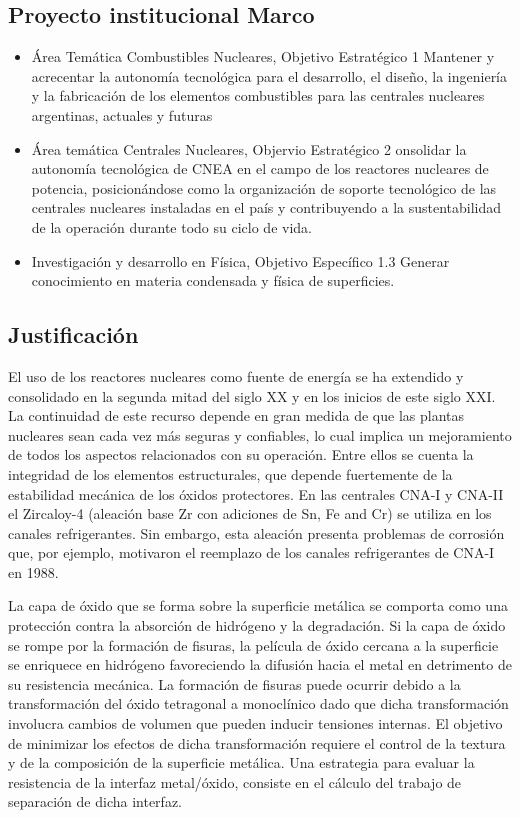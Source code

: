 \subsection{Proyecto institucional Marco}
\begin{itemize}
  \item { Área Temática Combustibles Nucleares, Objetivo Estratégico 1 }
    Mantener y acrecentar la autonomía tecnológica para el desarrollo, el diseño, la ingeniería y la fabricación de los elementos combustibles para las centrales nucleares argentinas, actuales y futuras

  \item {Área temática Centrales Nucleares, Objervio Estratégico 2}
onsolidar la autonomía tecnológica de CNEA en el campo de los reactores nucleares de potencia, posicionándose como la organización de soporte tecnológico de las centrales nucleares instaladas en el país y contribuyendo a la sustentabilidad de la operación durante todo su ciclo de vida. 

\item {Investigación y desarrollo en Física, Objetivo Específico 1.3}
Generar conocimiento en materia condensada y física de superficies.

\end{itemize}


\subsection{Justificación}

El uso de los reactores nucleares como fuente de energía se ha extendido y 
consolidado en la segunda mitad del siglo XX y en los inicios de este siglo 
XXI. La continuidad de este recurso depende en gran medida de que las plantas 
nucleares sean cada vez más seguras y confiables, lo cual implica un 
mejoramiento de todos los aspectos relacionados con su operación. Entre ellos 
se cuenta la integridad de los elementos estructurales, que depende fuertemente 
de la estabilidad mecánica de los óxidos protectores. En las centrales CNA-I y 
CNA-II el Zircaloy-4 (aleación base Zr con adiciones de Sn, Fe and Cr) se 
utiliza en los canales refrigerantes. Sin embargo, esta 
aleación presenta 
problemas de corrosión que, por ejemplo, motivaron el reemplazo de los canales 
refrigerantes de CNA-I en 1988.

La capa de óxido que se forma sobre la superficie metálica se comporta como una 
protección contra la absorción de hidrógeno y la degradación. Si la capa de 
óxido se rompe por la formación de fisuras, la película de óxido cercana a la 
superficie se enriquece en hidrógeno favoreciendo la difusión hacia el metal en 
detrimento de su resistencia mecánica. La formación de fisuras puede ocurrir 
debido a la transformación del óxido tetragonal a monoclínico dado que dicha 
transformación involucra cambios de volumen que pueden inducir tensiones 
internas. El objetivo de minimizar los efectos de dicha transformación requiere 
el control de la textura y de la composición de la superficie metálica. Una 
estrategia para evaluar la resistencia de la interfaz metal/óxido, consiste en 
el cálculo del trabajo de separación de dicha interfaz.


